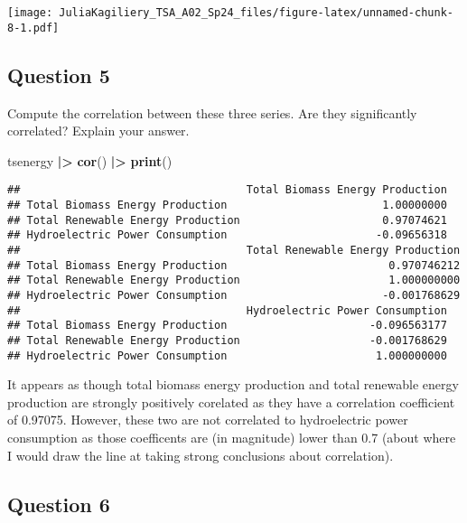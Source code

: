 \documentclass[
]{article}
\newenvironment{Shaded}{\begin{snugshade}}{\end{snugshade}}
\newcommand{\FunctionTok}[1]{\textcolor[rgb]{0.13,0.29,0.53}{\textbf{#1}}}
\newcommand{\NormalTok}[1]{#1}
\newcommand{\SpecialCharTok}[1]{\textcolor[rgb]{0.81,0.36,0.00}{\textbf{#1}}}
\begin{document}
\texttt{[image: JuliaKagiliery\_TSA\_A02\_Sp24\_files/figure-latex/unnamed-chunk-8-1.pdf]}

\hypertarget{question-5}{%
\subsection{Question 5}\label{question-5}}

Compute the correlation between these three series. Are they
significantly correlated? Explain your answer.

\begin{Shaded}
\begin{Highlighting}[]
\NormalTok{tsenergy }\SpecialCharTok{|\textgreater{}}
  \FunctionTok{cor}\NormalTok{() }\SpecialCharTok{|\textgreater{}}
  \FunctionTok{print}\NormalTok{()}
\end{Highlighting}
\end{Shaded}

\begin{verbatim}
##                                   Total Biomass Energy Production
## Total Biomass Energy Production                        1.00000000
## Total Renewable Energy Production                      0.97074621
## Hydroelectric Power Consumption                       -0.09656318
##                                   Total Renewable Energy Production
## Total Biomass Energy Production                         0.970746212
## Total Renewable Energy Production                       1.000000000
## Hydroelectric Power Consumption                        -0.001768629
##                                   Hydroelectric Power Consumption
## Total Biomass Energy Production                      -0.096563177
## Total Renewable Energy Production                    -0.001768629
## Hydroelectric Power Consumption                       1.000000000
\end{verbatim}

It appears as though total biomass energy production and total renewable
energy production are strongly positively corelated as they have a
correlation coefficient of 0.97075. However, these two are not
correlated to hydroelectric power consumption as those coefficents are
(in magnitude) lower than 0.7 (about where I would draw the line at
taking strong conclusions about correlation).

\hypertarget{question-6}{%
\subsection{Question 6}\label{question-6}}
\end{document}
